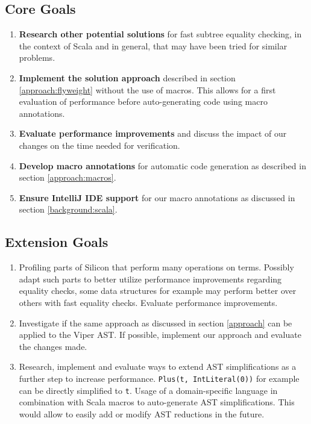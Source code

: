 \documentclass[11pt]{article}
\begin{document}
    \subsection{Core Goals}
    \begin{enumerate}
        \item \textbf{Research other potential solutions} for fast subtree equality checking, in the context of Scala
        and in general, that may have been tried for similar problems.
        \item \textbf{Implement the solution approach} described in section
        \ref{approach:flyweight} without the use of macros. This allows for a first
        evaluation of performance before auto-generating code using macro
        annotations.
        \item \textbf{Evaluate performance improvements} and discuss
        the impact of our changes on the time needed for verification.
        \item \textbf{Develop macro annotations} for automatic code generation as
        described in section \ref{approach:macros}.
        \item \textbf{Ensure IntelliJ IDE support} for our macro annotations as
        discussed in section \ref{background:scala}.
    \end{enumerate}
    \subsection{Extension Goals}
    \begin{enumerate}
        \item Profiling parts of Silicon that perform many operations on
        terms. Possibly adapt such parts to better utilize performance improvements
        regarding equality checks, some data structures for example may perform better
        over others with fast equality checks. Evaluate performance improvements.
        \item Investigate if the same approach as discussed in
        section \ref{approach} can be applied to the Viper AST.
        If possible, implement our approach and evaluate the changes made.
        \item Research, implement and evaluate ways to extend AST simplifications as a further step to increase performance.
        \texttt{Plus(t, IntLiteral(0))} for example can be directly simplified to \texttt{t}.
        Usage of a domain-specific language in combination with Scala macros to auto-generate AST
        simplifications. This would allow to easily add or modify
        AST reductions in the future. 

    \end{enumerate}

    \printbibliography
    
\end{document}
